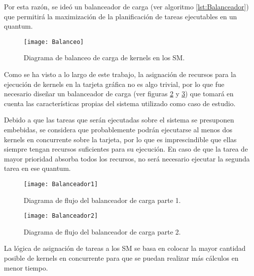 Por esta razón, se ideó un balanceador de carga (ver algoritmo \ref{lst:Balanceador}) que permitirá la maximización de la planificación de tareas ejecutables en un quantum.
\newline

        \begin{figure}[!h]
      \centering
        \texttt{[image: Balanceo]}
        \caption{Diagrama de balanceo de carga de kernels en los SM.}
        \label{fig:Balanceo}
    \end{figure}
    
    Como se ha visto a lo largo de este trabajo, la asignación de recursos para la ejecución de kernels en la tarjeta gráfica no es algo trivial, por lo que fue necesario diseñar un balanceador de carga (ver figuras \ref{fig:Balanceador1} y \ref{fig:Balanceador2}) que tomará en cuenta las características propias del sistema utilizado como caso de estudio.
    \newline
    
    Debido a que las tareas que serán ejecutadas sobre el sistema se presuponen embebidas, se considera que probablemente podrán ejecutarse al menos dos kernels en concurrente sobre la tarjeta, por lo que es imprescindible que ellas siempre tengan recursos suficientes para su ejecución. En caso de que la tarea de mayor prioridad absorba todos los recursos, no será necesario ejecutar la segunda tarea en ese quantum.
\newline

    \begin{figure}[!]
      \centering
        \texttt{[image: Balanceador1]}
        \caption{Diagrama de flujo del balanceador de carga parte 1.}
        \label{fig:Balanceador1}
    \end{figure}
    
    \begin{figure}[!]
      \centering
        \texttt{[image: Balanceador2]}
        \caption{Diagrama de flujo del balanceador de carga parte 2.}
        \label{fig:Balanceador2}
    \end{figure}

    

La lógica de asignación de tareas a los SM se basa en colocar la mayor cantidad posible de kernels en concurrente para que se puedan realizar más cálculos en menor tiempo.
\newline


